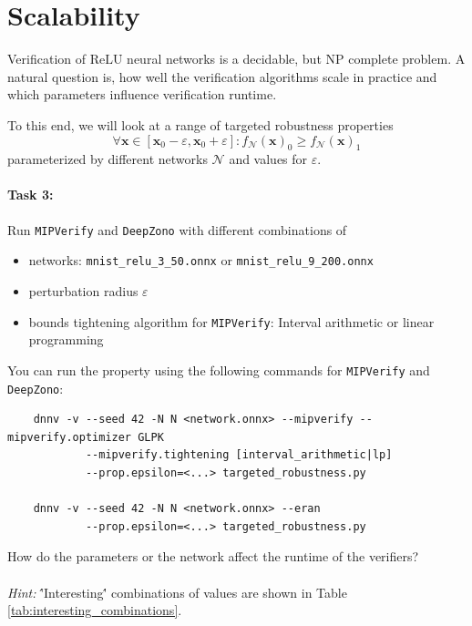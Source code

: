 \documentclass[11pt,fleqn]{article}
\let\vec\mathbf
\begin{document}
\section*{Scalability}

Verification of $\mathrm{ReLU}$ neural networks is a decidable, but NP complete problem.
A natural question is, how well the verification algorithms scale in practice and which
parameters influence verification runtime.

To this end, we will look at a range of targeted robustness properties
\begin{equation*}
    \forall \vec{x} \in [\vec{x}_0 - \varepsilon, \vec{x}_0 + \varepsilon]: f_{\mathcal{N}}(\vec{x})_0 \geq f_{\mathcal{N}}(\vec{x})_1
\end{equation*}
parameterized by different networks $\mathcal{N}$ and values for $\varepsilon$.

\paragraph{Task 3:}
Run \texttt{MIPVerify} and \texttt{DeepZono} with different combinations of 
\begin{itemize}
    \item networks: \texttt{mnist\_relu\_3\_50.onnx} or \texttt{mnist\_relu\_9\_200.onnx}
    \item perturbation radius $\varepsilon$
    \item bounds tightening algorithm for \texttt{MIPVerify}: Interval arithmetic or linear programming
\end{itemize}
You can run the property using the following commands for \texttt{MIPVerify} and \texttt{DeepZono}:
\begin{verbatim}
    dnnv -v --seed 42 -N N <network.onnx> --mipverify --mipverify.optimizer GLPK 
            --mipverify.tightening [interval_arithmetic|lp] 
            --prop.epsilon=<...> targeted_robustness.py

    dnnv -v --seed 42 -N N <network.onnx> --eran 
            --prop.epsilon=<...> targeted_robustness.py
\end{verbatim}
How do the parameters or the network affect the runtime of the verifiers?
\\
\\
\textit{Hint:}
\''Interesting\'' combinations of values are shown in Table \ref{tab:interesting_combinations}.
\end{document}
